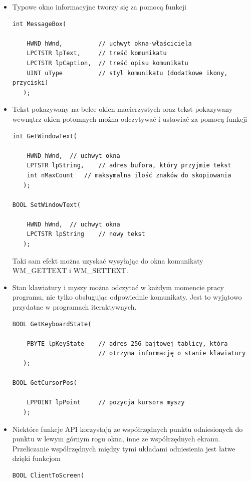 \begin{itemize}

\item Typowe okno informacyjne tworzy się za pomocą funkcji
\begin{scriptsize}
\begin{verbatim}
int MessageBox(

    HWND hWnd,          // uchwyt okna-właściciela
    LPCTSTR lpText,     // treść komunikatu
    LPCTSTR lpCaption,  // treść opisu komunikatu
    UINT uType          // styl komunikatu (dodatkowe ikony, przyciski)
   );
\end{verbatim}
\end{scriptsize}

\item Tekst pokazywany na belce okien macierzystych oraz tekst pokazywany wewnątrz okien potomnych
można odczytywać i ustawiać za pomocą funkcji
\begin{scriptsize}
\begin{verbatim}
int GetWindowText(

    HWND hWnd,	// uchwyt okna
    LPTSTR lpString,	// adres bufora, który przyjmie tekst
    int nMaxCount 	// maksymalna ilość znaków do skopiowania
   );

BOOL SetWindowText(

    HWND hWnd,	// uchwyt okna
    LPCTSTR lpString 	// nowy tekst
   );
\end{verbatim}
\end{scriptsize}
Taki sam efekt można uzyskać wysyłając do okna komunikaty WM\_GETTEXT i WM\_SETTEXT.

\item Stan klawiatury i myszy można odczytać w każdym momencie pracy programu, nie tylko
obsługując odpowiednie komunikaty. Jest to wyjątowo przydatne w programach iteraktywnych.
\begin{scriptsize}
\begin{verbatim}
BOOL GetKeyboardState(

    PBYTE lpKeyState    // adres 256 bajtowej tablicy, która 
                        // otrzyma informację o stanie klawiatury
   );

BOOL GetCursorPos(

    LPPOINT lpPoint     // pozycja kursora myszy  
   );
\end{verbatim}
\end{scriptsize}

\item Niektóre funkcje API korzystają ze współrzędnych punktu odniesionych do punktu w lewym górnym rogu
okna, inne ze współrzędnych ekranu. Przeliczanie współrzędnych między tymi układami odniesienia jest
łatwe dzięki funkcjom
\begin{scriptsize}
\begin{verbatim}
BOOL ClientToScreen(


\end{verbatim}
\end{scriptsize}
\end{itemize}

